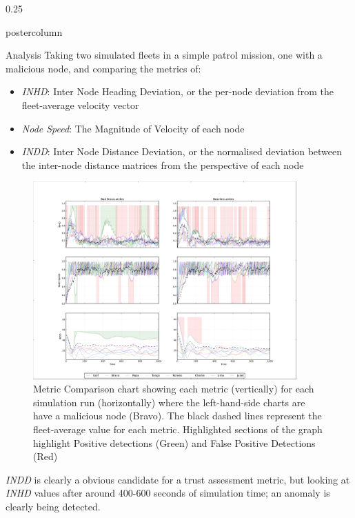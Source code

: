 \documentclass[final,hyperref={pdfpagelabels=false}]{beamer}
\def\colwidth{0.25\linewidth}
\begin{document}
\begin{frame}[fragile]
\begin{columns}[t]
\begin{column}{\colwidth}
\begin{beamercolorbox}[center,wd=\textwidth]{postercolumn}
\begin{minipage}[T]{.98\textwidth}
{%
            \begin{block}{Analysis}
              Taking two simulated fleets in a simple patrol mission, one with a malicious node, and comparing the metrics of:
              \begin{itemize}
                \item \emph{INHD}: Inter Node Heading Deviation, or the per-node deviation from the fleet-average velocity vector
                \item \emph{Node Speed}: The Magnitude of Velocity of each node
                \item \emph{INDD}: Inter Node Distance Deviation, or the normalised deviation between the inter-node distance matrices from the perspective of each node
              \end{itemize}
              \begin{figure}
                \includegraphics[width=0.9\textwidth]{figures/Bad_Bravo_Comparison_With_Detection}
                \caption{Metric Comparison chart showing each metric (vertically) for each simulation run (horizontally) where the left-hand-side charts are have a malicious node (Bravo). The black dashed lines represent the fleet-average value for each metric. Highlighted sections of the graph highlight Positive detections (Green) and False Positive Detections (Red)}
                \label{fig:Bad_Bravo_Comparison}
              \end{figure}
              
              \emph{INDD} is clearly a obvious candidate for a trust assessment metric, but looking at \emph{INHD} values after around 400-600 seconds of simulation time; an anomaly is clearly being detected. 


\end{block}}
\end{minipage}
\end{beamercolorbox}
\end{column}
\end{columns}
\end{frame}
\end{document}
